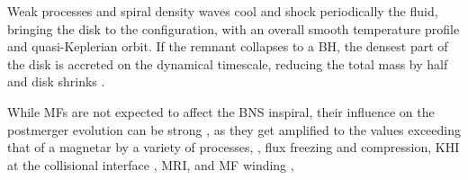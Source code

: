 Weak processes and spiral density waves cool and shock periodically the 
fluid, bringing the disk to the configuration, with an overall smooth 
temperature profile 
and quasi-Keplerian orbit.
%
If the remnant collapses to a \ac{BH}, the densest part of the disk is 
accreted on the dynamical timescale, reducing the total mass by half 
and disk shrinks \citep{Perego:2019adq}.

While \acp{MF} are not expected to affect the \ac{BNS} inspiral, their influence 
on the postmerger evolution can be strong \citep{Duez:2006qe,Kiuchi:2017zzg}, as they get amplified 
to the values exceeding that of a magnetar 
by a variety of processes, 
\eg, flux freezing and compression, \ac{KHI} at the collisional interface \citep{Kiuchi:2015sga},
\ac{MRI}, \citep{Duez:2006qe,Kiuchi:2017zzg} and \ac{MF} winding \citep{Duez:2006qe},


